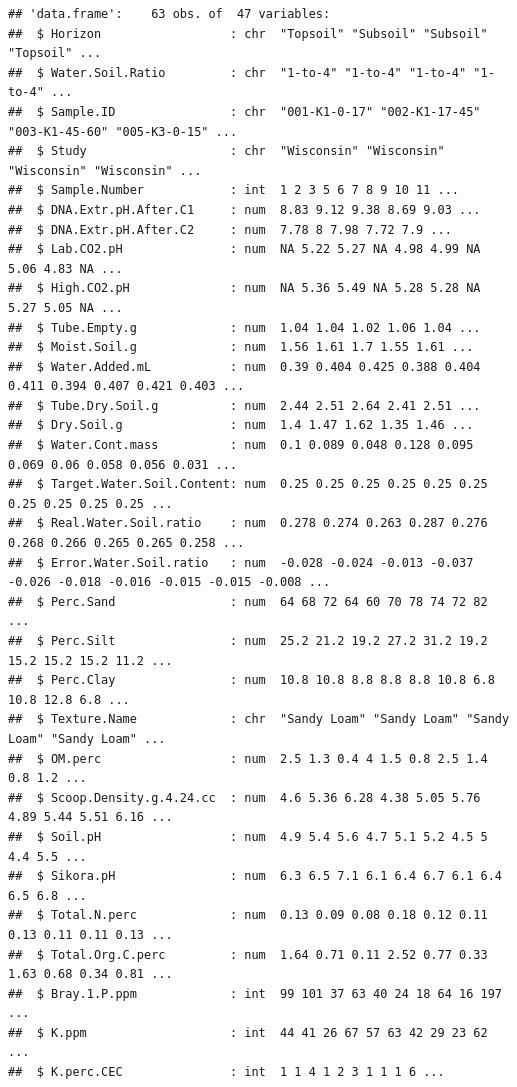 \documentclass[]{article}
\begin{document}
\begin{verbatim}
## 'data.frame':    63 obs. of  47 variables:
##  $ Horizon                  : chr  "Topsoil" "Subsoil" "Subsoil" "Topsoil" ...
##  $ Water.Soil.Ratio         : chr  "1-to-4" "1-to-4" "1-to-4" "1-to-4" ...
##  $ Sample.ID                : chr  "001-K1-0-17" "002-K1-17-45" "003-K1-45-60" "005-K3-0-15" ...
##  $ Study                    : chr  "Wisconsin" "Wisconsin" "Wisconsin" "Wisconsin" ...
##  $ Sample.Number            : int  1 2 3 5 6 7 8 9 10 11 ...
##  $ DNA.Extr.pH.After.C1     : num  8.83 9.12 9.38 8.69 9.03 ...
##  $ DNA.Extr.pH.After.C2     : num  7.78 8 7.98 7.72 7.9 ...
##  $ Lab.CO2.pH               : num  NA 5.22 5.27 NA 4.98 4.99 NA 5.06 4.83 NA ...
##  $ High.CO2.pH              : num  NA 5.36 5.49 NA 5.28 5.28 NA 5.27 5.05 NA ...
##  $ Tube.Empty.g             : num  1.04 1.04 1.02 1.06 1.04 ...
##  $ Moist.Soil.g             : num  1.56 1.61 1.7 1.55 1.61 ...
##  $ Water.Added.mL           : num  0.39 0.404 0.425 0.388 0.404 0.411 0.394 0.407 0.421 0.403 ...
##  $ Tube.Dry.Soil.g          : num  2.44 2.51 2.64 2.41 2.51 ...
##  $ Dry.Soil.g               : num  1.4 1.47 1.62 1.35 1.46 ...
##  $ Water.Cont.mass          : num  0.1 0.089 0.048 0.128 0.095 0.069 0.06 0.058 0.056 0.031 ...
##  $ Target.Water.Soil.Content: num  0.25 0.25 0.25 0.25 0.25 0.25 0.25 0.25 0.25 0.25 ...
##  $ Real.Water.Soil.ratio    : num  0.278 0.274 0.263 0.287 0.276 0.268 0.266 0.265 0.265 0.258 ...
##  $ Error.Water.Soil.ratio   : num  -0.028 -0.024 -0.013 -0.037 -0.026 -0.018 -0.016 -0.015 -0.015 -0.008 ...
##  $ Perc.Sand                : num  64 68 72 64 60 70 78 74 72 82 ...
##  $ Perc.Silt                : num  25.2 21.2 19.2 27.2 31.2 19.2 15.2 15.2 15.2 11.2 ...
##  $ Perc.Clay                : num  10.8 10.8 8.8 8.8 8.8 10.8 6.8 10.8 12.8 6.8 ...
##  $ Texture.Name             : chr  "Sandy Loam" "Sandy Loam" "Sandy Loam" "Sandy Loam" ...
##  $ OM.perc                  : num  2.5 1.3 0.4 4 1.5 0.8 2.5 1.4 0.8 1.2 ...
##  $ Scoop.Density.g.4.24.cc  : num  4.6 5.36 6.28 4.38 5.05 5.76 4.89 5.44 5.51 6.16 ...
##  $ Soil.pH                  : num  4.9 5.4 5.6 4.7 5.1 5.2 4.5 5 4.4 5.5 ...
##  $ Sikora.pH                : num  6.3 6.5 7.1 6.1 6.4 6.7 6.1 6.4 6.5 6.8 ...
##  $ Total.N.perc             : num  0.13 0.09 0.08 0.18 0.12 0.11 0.13 0.11 0.11 0.13 ...
##  $ Total.Org.C.perc         : num  1.64 0.71 0.11 2.52 0.77 0.33 1.63 0.68 0.34 0.81 ...
##  $ Bray.1.P.ppm             : int  99 101 37 63 40 24 18 64 16 197 ...
##  $ K.ppm                    : int  44 41 26 67 57 63 42 29 23 62 ...
##  $ K.perc.CEC               : int  1 1 4 1 2 3 1 1 1 6 ...

\end{verbatim}
\end{document}
